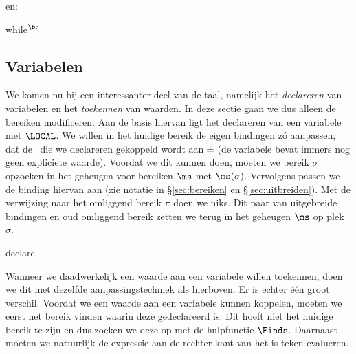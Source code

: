 en:

\begin{NSAxiom}{while$^\bF$}
  \begin{prooftree}
  \end{prooftree}
  \begin{NSConditions}
  \end{NSConditions}
\end{NSAxiom}

\subsection{Variabelen}

We komen nu bij een interessanter deel van de taal, namelijk het \emph{declareren} van variabelen en het \emph{toekennen} van waarden. In deze sectie gaan we dus alleen de bereiken modificeren. Aan de basis hiervan ligt het declareren van een variabele met $\LOCAL$. We willen in het huidige bereik de eigen bindingen zó aanpassen, dat de \Id\ die we declareren gekoppeld wordt aan $\nil$ (de variabele bevat immers nog geen expliciete waarde). Voordat we dit kunnen doen, moeten we bereik $\sigma$ opzoeken in het geheugen voor bereiken $\ms$ met $\ms(\sigma)$. Vervolgens passen we de binding hiervan aan (zie notatie in §\ref{sec:bereiken} en §\ref{sec:uitbreiden}). Met de verwijzing naar het omliggend bereik $\pi$ doen we niks. Dit paar van uitgebreide bindingen en oud omliggend bereik zetten we terug in het geheugen $\ms$ op plek $\sigma$.

\begin{NSAxiom}{declare}
  \begin{prooftree}
  \end{prooftree}
  \begin{NSConditions}
  \end{NSConditions}
\end{NSAxiom}

Wanneer we daadwerkelijk een waarde aan een variabele willen toekennen, doen we dit met dezelfde aanpassingstechniek als hierboven. Er is echter één groot verschil. Voordat we een waarde aan een variabele kunnen koppelen, moeten we eerst het bereik vinden waarin deze gedeclareerd is. Dit hoeft niet het huidige bereik te zijn en dus zoeken we deze op met de hulpfunctie $\Finds$. Daarnaast moeten we natuurlijk de expressie aan de rechter kant van het is-teken evalueren.

